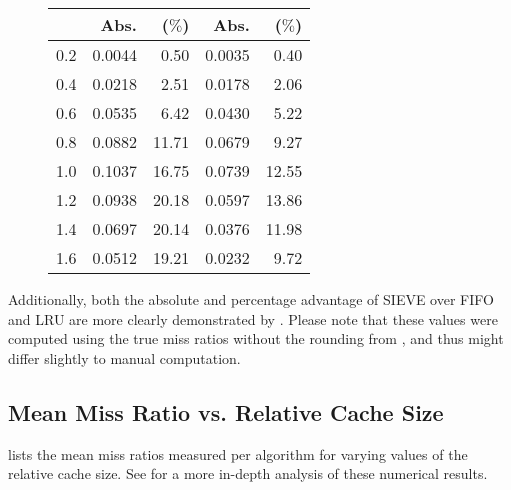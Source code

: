 \begin{figure}[h!]
\begin{minipage}[t]{0.47\textwidth}
\begin{tabular}{l rr rr}
            & \textbf{Abs.} & \textbf{($\%$)} & \textbf{Abs.} & \textbf{($\%$)} \\
            \midrule
            0.2 & 0.0044 & 0.50 & 0.0035 & 0.40 \\
            0.4 & 0.0218 & 2.51 & 0.0178 & 2.06 \\
            0.6 & 0.0535 & 6.42 & 0.0430 & 5.22 \\
            0.8 & 0.0882 & 11.71 & 0.0679 & 9.27 \\
            1.0 & 0.1037 & 16.75 & 0.0739 & 12.55 \\
            1.2 & 0.0938 & 20.18 & 0.0597 & 13.86 \\
            1.4 & 0.0697 & 20.14 & 0.0376 & 11.98 \\
            1.6 & 0.0512 & 19.21 & 0.0232 & 9.72 \\
            \bottomrule
        \end{tabular}
    \end{minipage}
\end{figure}


Additionally, both the absolute and percentage advantage of SIEVE over FIFO and LRU are more clearly demonstrated by . Please note that these values were computed using the true miss ratios without the rounding from , and thus might differ slightly to manual computation.

\newpage
\subsection{Mean Miss Ratio vs. Relative Cache Size}\label{appendix:rel-cache-size}

 lists the mean miss ratios measured per algorithm for varying values of the relative cache size. See  for a more in-depth analysis of these numerical results.

